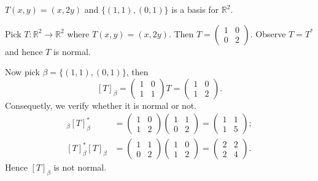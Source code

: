 \begin{Exercise}
	\begin{answer}
		$T(x,y) = (x, 2y)$ and $\{(1,1),(0,1)\}$ is a basis for $\mathbb{R}^2$.
	\end{answer}
	\begin{solution}
		Pick $T:\mathbb{R}^2\to \mathbb{R}^2$ where $T(x,y) = (x,2y)$. Then $T = \begin{pmatrix}
		1 & 0 \\
		0 & 2 
		\end{pmatrix}$. Observe $T = T^*$ and hence $T$ is normal.
		
		Now pick $\beta = \{(1,1),(0,1)\}$, then
		$$
		[T]_{\beta} = \begin{pmatrix}
		1 & 0 \\
		1 & 1
		\end{pmatrix} T = \begin{pmatrix}
		1 & 0 \\
		1 & 2
		\end{pmatrix}.
		$$
		Consequetly, we verify whether it is normal or not.
		\begin{align*}
		[T]_{\beta} [T]_{\beta}^* &= \begin{pmatrix}
		1 & 0 \\
		1 & 2
		\end{pmatrix} \begin{pmatrix}
		1 & 1 \\
		0 & 2
		\end{pmatrix} = \begin{pmatrix}
		1 & 1 \\
		1 & 5
		\end{pmatrix}; \\
		[T]_{\beta}^* [T]_{\beta} &= \begin{pmatrix}
		1 & 1 \\
		0 & 2
		\end{pmatrix} \begin{pmatrix}
		1 & 0 \\
		1 & 2
		\end{pmatrix} = \begin{pmatrix}
		2 & 2 \\
		2 & 4
		\end{pmatrix}.
		\end{align*}
		Hence $[T]_{\beta}$ is not normal.
	\end{solution}
\end{Exercise}